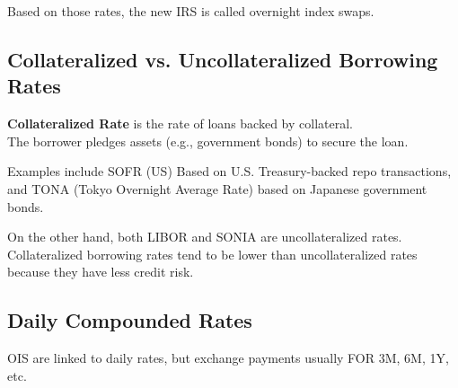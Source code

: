 Based on those rates, the new IRS is called overnight index swaps.

\subsection{Collateralized vs. Uncollateralized Borrowing Rates}
\begin{definition}
    \textbf{Collateralized Rate} is the rate of loans backed by collateral.\\
    The borrower pledges assets (e.g., government bonds) to secure the loan.
\end{definition}
Examples include SOFR (US) Based on U.S. Treasury-backed repo transactions,
and TONA (Tokyo Overnight Average Rate) based on Japanese government bonds.

On the other hand, both LIBOR and SONIA are uncollateralized rates.\\

Collateralized borrowing rates tend to be lower than 
uncollateralized rates because they have less credit risk.

\subsection{Daily Compounded Rates}
OIS are linked to daily rates, but exchange payments usually FOR 3M, 6M, 1Y, etc.\\